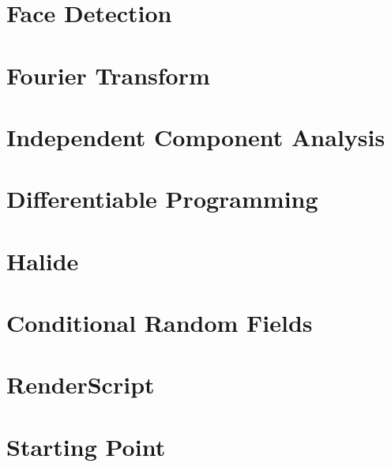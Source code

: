\section{Face Detection}
\section{Fourier Transform}
\section{Independent Component Analysis}
\section{Differentiable Programming}
\section{Halide}
\section{Conditional Random Fields}
\section{RenderScript}
\section{Starting Point}
